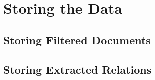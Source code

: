 \section{Storing the Data}
\subsection{Storing Filtered Documents}
\subsection{Storing Extracted Relations}

